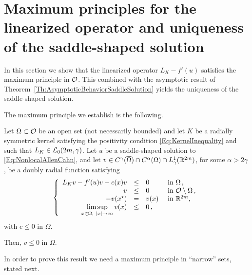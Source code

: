 \section{Maximum principles for the linearized operator and uniqueness of the saddle-shaped solution}
\label{Sec:MaximumPrinciple}

In this section we show that the linearized operator $L_K  -f'(u)$ satisfies the maximum principle in $\mathcal{O}$. This combined with the asymptotic result of Theorem~\ref{Th:AsymptoticBehaviorSaddleSolution} yields the uniqueness of the saddle-shaped solution.

The maximum principle we establish is the following.

\begin{proposition}
	\label{Prop:MaximumPrincipleLinearized}
	Let $\Omega \subset \mathcal{O}$ be an open set (not necessarily bounded) and let $K$ be a radially symmetric kernel satisfying the positivity condition \eqref{Eq:KernelInequality} and such that $L_K\in \mathcal{L}_0(2m,\gamma)$. Let $u$ be a saddle-shaped solution to \eqref{Eq:NonlocalAllenCahn}, and let $v\in C^\gamma(\overline{\Omega})\cap C^\alpha(\Omega)\cap L^1_\gamma(\mathbb{R}^{2m})$, for some $\alpha > 2\gamma$, be a doubly radial function satisfying
	$$
	\left\{\begin{array}{rcll}
	L_K v - f'(u)v - c(x)v &\leq & 0 &\textrm{ in } \Omega\,,\\
	v &\leq & 0 &\textrm{ in } \mathcal{O} \setminus \Omega\,,\\
	- v(x^\star) & = & v(x) &\textrm{ in } \mathbb{R}^{2m},\\
	\displaystyle \limsup_{x\in \Omega, \ |x|\to \infty} v(x) &\leq & 0\,,
	\end{array} \right.
	$$
	with $c\leq 0$ in $\Omega$.
	
	Then, $v \leq 0$ in $\Omega$.
\end{proposition}

In order to prove this result we need a maximum principle in ``narrow'' sets, stated next.

